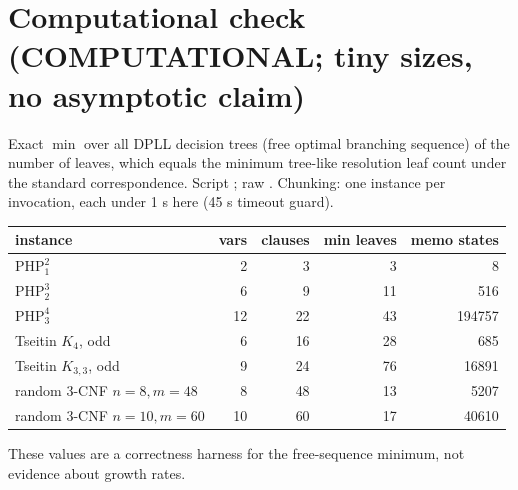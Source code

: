 \documentclass[11pt]{article}
\theoremstyle{definition}\newtheorem{definition}[theorem]{Definition}
\theoremstyle{remark}\newtheorem{remark}[theorem]{Remark}
\begin{document}
\section{Computational check (COMPUTATIONAL; tiny sizes, no asymptotic claim)}
Exact $\min$ over all DPLL decision trees (free optimal branching sequence) of the number of leaves, which equals the minimum
tree-like resolution leaf count under the standard correspondence. Script
; raw .
Chunking: one instance per invocation, each under 1 s here (45 s timeout guard).
\begin{center}\begin{tabular}{lrrrr}\toprule
instance & vars & clauses & min leaves & memo states\\\midrule
$\mathrm{PHP}^2_1$ & 2 & 3 & 3 & 8\\
$\mathrm{PHP}^3_2$ & 6 & 9 & 11 & 516\\
$\mathrm{PHP}^4_3$ & 12 & 22 & 43 & 194757\\
Tseitin $K_4$, odd & 6 & 16 & 28 & 685\\
Tseitin $K_{3,3}$, odd & 9 & 24 & 76 & 16891\\
random 3-CNF $n{=}8,m{=}48$ & 8 & 48 & 13 & 5207\\
random 3-CNF $n{=}10,m{=}60$ & 10 & 60 & 17 & 40610\\\bottomrule\end{tabular}\end{center}
These values are a correctness harness for the free-sequence minimum, not evidence about growth rates.
\end{document}

